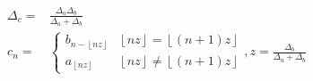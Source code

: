 \documentclass{article}
\begin{document}
\begin{titlepage}


\begin{equation*}
\begin{aligned}
\Delta _{c}= & \frac{\Delta _{a}\Delta _{b}}{\Delta _{a}+\Delta _{b}} \\
c_{n}= & \left\{ 
\begin{array}{cc}
b_{n-\left\lfloor n z \right\rfloor } 
& \left\lfloor n z \right\rfloor =\left\lfloor \left( n+1\right) z \right\rfloor \\ 
a_{\left\lfloor n z \right\rfloor } & \left\lfloor n z \right\rfloor \neq \left\lfloor \left( n+1\right) z \right\rfloor
\end{array}
\right. , z =\frac{\Delta _{b}}{\Delta _{a}+\Delta _{b}}  \label{interlace}
\end{aligned}
\end{equation*}


\end{titlepage}
\end{document}
